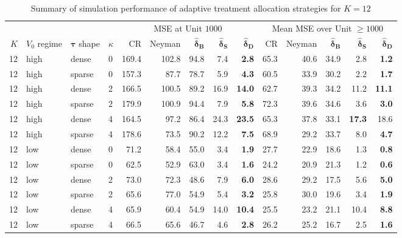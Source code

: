 \documentclass{article}
\newcommand{\bstau}{\boldsymbol \tau}
\newcommand{\bsdeltad}{\boldsymbol{\hat \delta_{\textbf{D}}}}
\newcommand{\bsdeltb}{\boldsymbol {\hat \delta_B}}
\newcommand{\bsdelts}{\boldsymbol {\hat \delta_S}}
\begin{document}
\begin{table}[p]
\centering
\begin{threeparttable}
\caption{Summary of simulation performance of adaptive treatment allocation strategies for $K = 12$}
\label{tab:adaptiveSimsK12}

\small
\setlength{\tabcolsep}{4pt}
\begin{tabular}{rlll|rrrrr|rrrrr}
\toprule
 &  &  & 
& \multicolumn{5}{c}{MSE at Unit $1000$}
& \multicolumn{5}{c}{Mean MSE over Unit $\geq 1000$} \\
\cmidrule(lr){5-9} \cmidrule(lr){10-14}
$K$& $V_0$ regime & $\bstau$ shape & $\kappa$ & CR & Neyman & $\bsdeltb$ & $\bsdelts$ & $\bsdeltad$
& CR & Neyman & $\bsdeltb$ & $\bsdelts$ & $\bsdeltad$ \\
\midrule
12 & high & dense & 0 & 169.4 & 102.8 & 94.8 & 7.4 & \textbf{2.8} & 65.3 & 40.6 & 34.9 & 2.8 & \textbf{1.2}\\
12 & high & sparse & 0 & 157.3 & 87.7 & 78.7 & 5.9 & \textbf{4.3} & 60.5 & 33.9 & 30.2 & 2.2 & \textbf{1.7}\\
12 & high & dense & 2 & 166.5 & 100.5 & 89.2 & 16.9 & \textbf{14.0} & 62.7 & 39.3 & 34.2 & 11.2 & \textbf{11.1}\\
12 & high & sparse & 2 & 179.9 & 100.9 & 94.4 & 7.9 & \textbf{5.8} & 72.3 & 39.6 & 34.6 & 3.6 & \textbf{3.0}\\
12 & high & dense & 4 & 164.5 & 97.2 & 86.4 & 24.3 & \textbf{23.5} & 65.3 & 37.8 & 33.1 & \textbf{17.3} & 18.6\\
12 & high & sparse & 4 & 178.6 & 73.5 & 90.2 & 12.2 & \textbf{7.5} & 68.9 & 29.2 & 33.7 & 8.0 & \textbf{4.7}\\
\midrule
12 & low & dense & 0 & 71.2 & 58.4 & 55.0 & 3.4 & \textbf{1.9} & 27.7 & 22.9 & 18.6 & 1.3 & \textbf{0.8}\\
12 & low & sparse & 0 & 62.5 & 52.9 & 63.0 & 3.4 & \textbf{1.6} & 24.2 & 20.9 & 21.3 & 1.2 & \textbf{0.6}\\
12 & low & dense & 2 & 73.0 & 72.3 & 48.6 & 7.9 & \textbf{6.0} & 28.6 & 29.2 & 17.5 & 5.6 & \textbf{5.0}\\
12 & low & sparse & 2 & 65.6 & 77.0 & 54.9 & 5.4 & \textbf{3.2} & 25.8 & 30.0 & 19.6 & 3.4 & \textbf{1.9}\\
12 & low & dense & 4 & 65.9 & 60.4 & 54.9 & 14.0 & \textbf{10.4} & 25.5 & 23.2 & 21.1 & 10.4 & \textbf{8.8}\\
12 & low & sparse & 4 & 66.5 & 65.6 & 46.7 & 4.6 & \textbf{2.8} & 26.2 & 25.2 & 16.7 & 2.5 & \textbf{1.6}\\
\bottomrule
\end{tabular}


\end{threeparttable}
\end{table}
\end{document}
